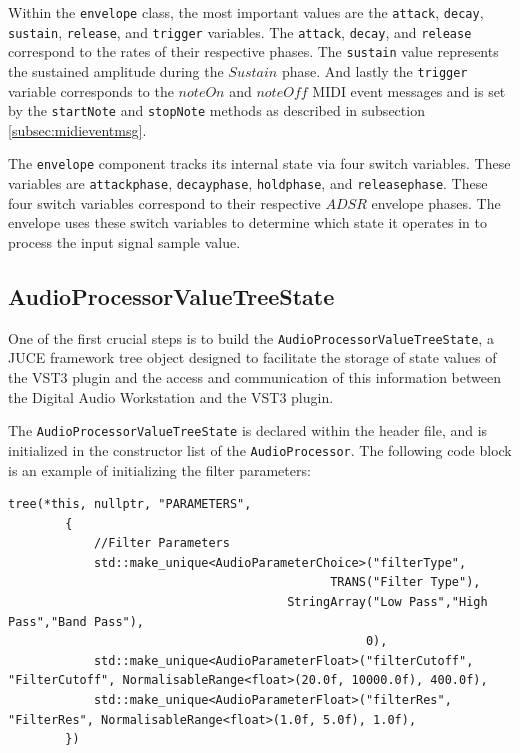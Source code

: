 \documentclass[a4paper,12pt]{report}
\begin{document}
Within the \texttt{envelope} class, the most important values are the \texttt{attack}, \texttt{decay}, \texttt{sustain}, \texttt{release}, and \texttt{trigger} variables. The \texttt{attack}, \texttt{decay}, and \texttt{release} correspond to the rates of their respective phases. The \texttt{sustain} value represents the sustained amplitude during the $Sustain$ phase. And lastly the \texttt{trigger} variable corresponds to the $noteOn$ and $noteOff$ MIDI event messages and is set by the \texttt{startNote} and \texttt{stopNote} methods as described in subsection \ref{subsec:midieventmsg}.

The \texttt{envelope} component tracks its internal state via four switch variables. These variables are \texttt{attackphase}, \texttt{decayphase}, \texttt{holdphase}, and \texttt{releasephase}. These four switch variables correspond to their respective $ADSR$ envelope phases. The envelope uses these switch variables to determine which state it operates in to process the input signal sample value. 

\subsection{AudioProcessorValueTreeState}
\label{subsec:apvt}
One of the first crucial steps is to build the \texttt{AudioProcessorValueTreeState}, a JUCE framework tree object designed to facilitate the storage of state values of the VST3 plugin and the access and communication of this information between the Digital Audio Workstation and the VST3 plugin.

The \texttt{AudioProcessorValueTreeState} is declared within the header file, and is initialized in the constructor list of the \texttt{AudioProcessor}. The following code block is an example of initializing the filter parameters:


 \noindent\begin{minipage}{\linewidth} \begin{lstlisting}[caption={Initializing Filter Parameters},label={code:initfilterparam},captionpos=b]
tree(*this, nullptr, "PARAMETERS",
        {   
            //Filter Parameters
            std::make_unique<AudioParameterChoice>("filterType",
                                             TRANS("Filter Type"),
                                       StringArray("Low Pass","High Pass","Band Pass"),
                                                  0),
            std::make_unique<AudioParameterFloat>("filterCutoff", "FilterCutoff", NormalisableRange<float>(20.0f, 10000.0f), 400.0f),
            std::make_unique<AudioParameterFloat>("filterRes", "FilterRes", NormalisableRange<float>(1.0f, 5.0f), 1.0f),
        })
\end{lstlisting} \end{minipage}
\end{document}
